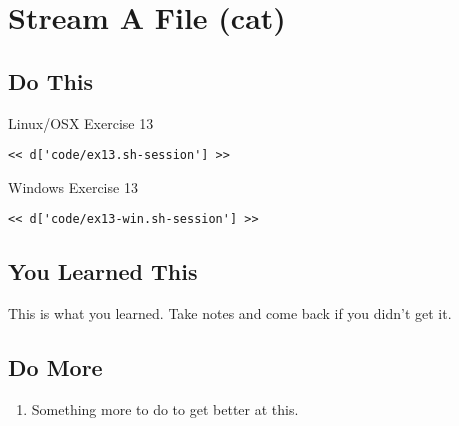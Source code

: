 \chapter{Stream A File (cat)}

\section{Do This}

\begin{code}{Linux/OSX Exercise 13}
\begin{Verbatim}
<< d['code/ex13.sh-session'] >>
\end{Verbatim}
\end{code}

\begin{code}{Windows Exercise 13}
\begin{Verbatim}
<< d['code/ex13-win.sh-session'] >>
\end{Verbatim}
\end{code}

\section{You Learned This}

This is what you learned.  Take notes and come back if you didn't get it.

\section{Do More}

\begin{enumerate}
\item Something more to do to get better at this.
\end{enumerate}

